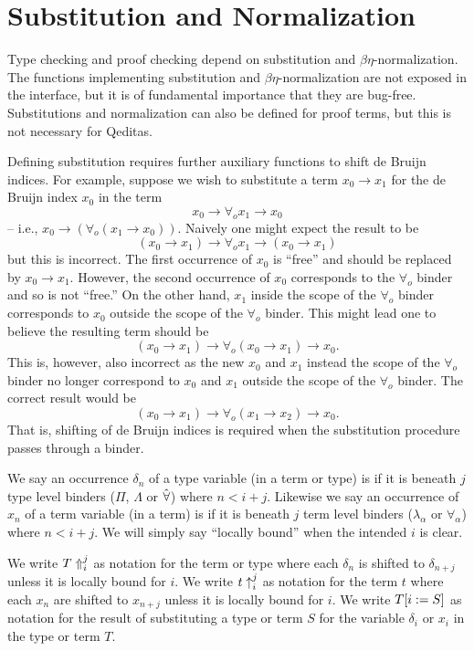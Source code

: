 \section{Substitution and Normalization}

Type checking and proof checking depend on substitution and $\beta\eta$-normalization.
The functions implementing substitution and $\beta\eta$-normalization are not exposed in the
interface, but it is of fundamental importance that they are bug-free.
Substitutions and normalization can also be defined for proof terms,
but this is not necessary for Qeditas.

Defining substitution requires further auxiliary functions to shift
de Bruijn indices.
For example, suppose we wish to substitute a term
$x_0\to x_1$ for the de Bruijn index $x_0$ in the term
$$x_0\to\forall_o x_1\to x_0$$
-- i.e., $x_0\to (\forall_o (x_1\to x_0))$.
Naively one might expect the result to be
$$(x_0\to x_1)\to\forall_o x_1\to (x_0 \to x_1)$$
but this is incorrect.
The first occurrence of $x_0$ is ``free'' and should be replaced
by $x_0\to x_1$.
However, the second occurrence of $x_0$ corresponds to the $\forall_o$ binder
and so is not ``free.'' On the other hand, $x_1$ inside the scope of the $\forall_o$ binder
corresponds to $x_0$ outside the scope of the $\forall_o$ binder.
This might lead one to believe the resulting term should be
$$(x_0\to x_1)\to\forall_o (x_0\to x_1)\to x_0.$$
This is, however, also incorrect as the new $x_0$ and $x_1$ instead the scope of the $\forall_o$ binder
no longer correspond to $x_0$ and $x_1$ outside the scope of the $\forall_o$ binder.
The correct result would be
$$(x_0\to x_1)\to\forall_o (x_1\to x_2)\to x_0.$$
That is, shifting of de Bruijn indices is required when the substitution procedure
passes through a binder.

We say an occurrence $\delta_n$ of a type variable (in a term or type) is {}
if it is beneath $j$ type level binders ($\Pi$, $\Lambda$ or $\tforall$) where $n < i+j$.
Likewise we say an occurrence of $x_n$ of a term variable (in a term) is {}
if it is beneath $j$ term level binders ($\lambda_\alpha$ or $\forall_\alpha$) where $n < i+j$.
We will simply say ``locally bound'' when the intended $i$ is clear.

We write $\dbtpsh{i}{j}{T}$ as notation for the term or type 
where each $\delta_n$ is shifted to $\delta_{n+j}$ unless it is locally bound for $i$.
We write $\dbsh{i}{j}{t}$ as notation for the term $t$
where each $x_n$ are shifted to $x_{n+j}$ unless it is locally bound for $i$.
We write $\dbsub{i}{S}{T}$ as notation for the result of substituting a
type or term $S$ for the variable $\delta_i$ or $x_i$ in the type or term $T$.

